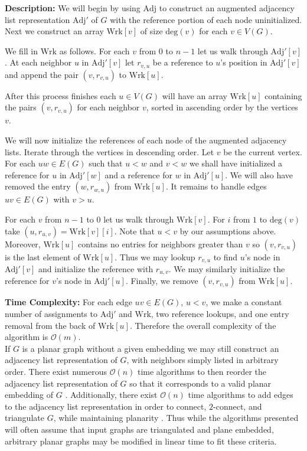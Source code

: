 \documentclass[letterpaper, 12pt]{article}
\theoremstyle{thm}
\begin{document}
\noindent\textbf{Description:} We will begin by using $\text{Adj}$ to construct
an augmented adjacency list representation $\text{Adj}'$ of $G$ with the
reference portion of each node uninitialized.
Next we construct an array $\text{Wrk}[v]$ of size $\text{deg}(v)$ for each
$v\in V(G)$.

We fill in $\text{Wrk}$ as follows. For each $v$ from $0$ to $n-1$ let us walk
through $\text{Adj}'[v]$. At each neighbor $u$ in $\text{Adj}'[v]$ let
$r_{v,u}$ be a reference to $u$'s position in $\text{Adj}'[v]$ and append the
pair $(v,r_{v,u})$ to $\text{Wrk}[u]$.

After this process finishes each $u\in V(G)$ will have an array $\text{Wrk}[u]$
containing the pairs $(v,r_{v,u})$ for each neighbor $v$, sorted in ascending
order by the vertices $v$.

We will now initialize the references of each node of
the augmented adjacency lists.
Iterate through the vertices in descending order. Let $v$ be the current
vertex. For each 
$uw\in E(G)$ such that $u<w$ and $v<w$ we shall have initialized a reference
for $u$ in $\text{Adj}'[w]$ and a reference for $w$ in $\text{Adj}'[u]$. We
will also have removed the entry $(w,r_{w,u})$ from $\text{Wrk}[u]$. It remains
to handle edges $uv\in E(G)$ with $v>u$.

For each $v$ from $n-1$ to $0$ let us walk through $\text{Wrk}[v]$. For $i$ from
$1$ to $\text{deg}(v)$ take $(u,r_{u,v})=\text{Wrk}[v][i]$. Note that $u<v$ by our
assumptions above. Moreover, $\text{Wrk}[u]$ contains no entries for neighbors
greater than $v$ so $(v,r_{v,u})$ is the last element of $\text{Wrk}[u]$. Thus
we may lookup $r_{v,u}$ to find $u$'s node in $\text{Adj}'[v]$ and initialize
the reference with $r_{u,v}$. We may similarly initialize the reference for
$v$'s node in $\text{Adj}'[u]$. Finally, we remove $(v,r_{v,u})$ from
$\text{Wrk}[u]$.

\noindent\textbf{Time Complexity:} For each edge $uv\in E(G)$, $u<v$, we make a
constant number of assignments to $\text{Adj}'$ and $\text{Wrk}$, two reference
lookups, and one entry removal from the back of $\text{Wrk}[u]$.
Therefore the overall complexity of the algorithm is $\mathcal{O}(m)$.\\

If $G$ is a planar graph without a given embedding we may still construct an
adjacency list representation of $G$, with neighbors simply listed in arbitrary
order. There exist numerous $\mathcal{O}(n)$ time algorithms to then reorder the
adjacency list representation of $G$ so that it corresponds to a valid planar
embedding of $G$ \cite{tarjan, lempel, boyer,
booth}. Additionally, there exist $\mathcal{O}(n)$ time algorithms to add edges
to the adjacency list representation in order to connect, $2$-connect, and
triangulate $G$, while maintaining planarity \cite{hagerup,reed,eswaran}.
Thus while the algorithms presented will often assume that input graphs are
triangulated and plane embedded, arbitrary planar graphs may be modified in
linear time to fit these criteria.
\end{document}
